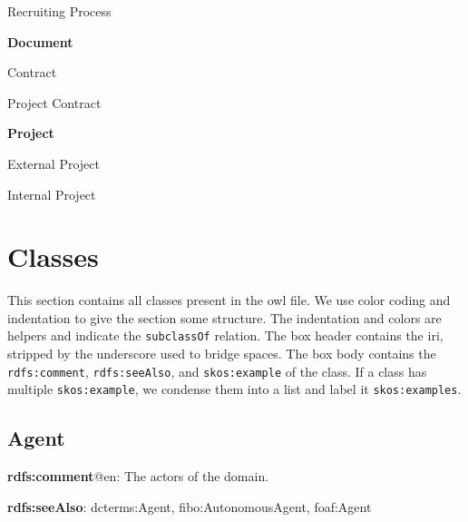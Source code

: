 \documentclass[a4paper, DIV=13, BCOR=0cm]{scrbook}
\newcommand{\relation}[1]{\texttt{#1}}
\newcommand{\prop}[1]{\texttt{#1}}
\begin{document}
\begin{multicols}{2}
\begin{compactitem}
\begin{compactitem}
			\item Recruiting Process
		\end{compactitem}
		\item \textbf{Document}
		\begin{compactitem}
			\item Contract
			\begin{compactitem}
				\item Project Contract
			\end{compactitem}
		\end{compactitem}
		\item \textbf{Project}
		\begin{compactitem}
			\item External Project
			\item Internal Project
		\end{compactitem}
	\end{compactitem}
\end{multicols}

\section{Classes}
This section contains all classes present in the \gls{owl} file. We use color coding and indentation to give the section some structure. The indentation and colors are helpers and indicate the \relation{subclassOf} relation. The box header contains the \gls{iri}, stripped by the underscore used to bridge spaces. The box body contains the \prop{rdfs:comment}, \prop{rdfs:seeAlso}, and \prop{skos:example} of the class. If a class has multiple \relation{skos:example}, we condense them into a list and label it \relation{skos:examples}.

\subsection{Agent}
\begin{mdframed}[style=onto, frametitle={Agent}]
	{%
		\begin{compactitem}
			\item \textbf{rdfs:comment}@en: The actors of the domain.
			\item \textbf{rdfs:seeAlso}: dcterms:Agent, fibo:AutonomousAgent, foaf:Agent
		\end{compactitem}
	} %
\end{mdframed}
\end{document}
